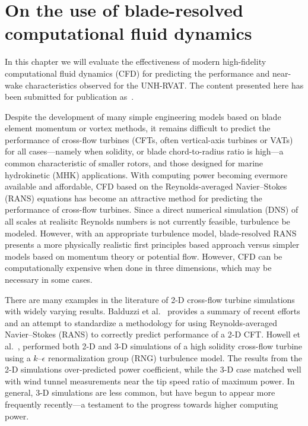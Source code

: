 \chapter{On the use of blade-resolved computational fluid
    dynamics}\label{chap:CFD}

In this chapter we will evaluate the effectiveness of modern high-fidelity
computational fluid dynamics (CFD) for predicting the performance and near-wake
characteristics observed for the UNH-RVAT. The content presented here has been
submitted for publication as~\cite{Bachant2016-BR-CFD}.

Despite the development of many simple engineering models based on blade element
momentum or vortex methods, it remains difficult to predict the performance of
cross-flow turbines (CFTs, often vertical-axis turbines or VATs) for all
cases---namely when solidity, or blade chord-to-radius ratio is high---a common
characteristic of smaller rotors, and those designed for marine hydrokinetic
(MHK) applications. With computing power becoming evermore available and
affordable, CFD based on the Reynolds-averaged Navier--Stokes (RANS) equations
has become an attractive method for predicting the performance of cross-flow
turbines. Since a direct numerical simulation (DNS) of all scales at realisitc
Reynolds numbers is not currently feasible, turbulence be modeled. However, with
an appropriate turbulence model, blade-resolved RANS presents a more physically
realistic first principles based approach versus simpler models based on
momentum theory or potential flow. However, CFD can be computationally expensive
when done in three dimensions, which may be necessary in some cases.


There are many examples in the literature of 2-D cross-flow turbine simulations
with widely varying results. Balduzzi et al.~\cite{Balduzzi2016} provides
a summary of recent efforts and an attempt to standardize a methodology for
using Reynolds-averaged Navier--Stokes (RANS) to correctly predict performance
of a 2-D CFT. Howell et al.~\cite{Howell2010}, performed both 2-D and 3-D
simulations of a high solidity cross-flow turbine using a $k$--$\epsilon$
renormalization group (RNG) turbulence model. The results from the 2-D
simulations over-predicted power coefficient, while the 3-D case matched well
with wind tunnel measurements near the tip speed ratio of maximum power. In
general, 3-D simulations are less common, but have begun to appear more
frequently recently---a testament to the progress towards higher computing
power.

